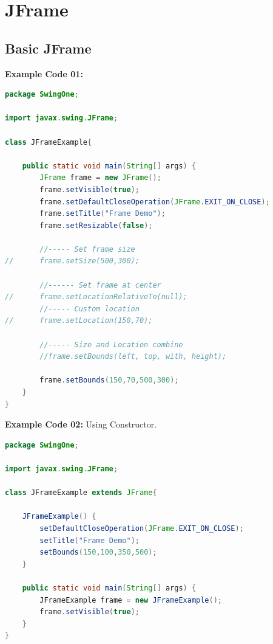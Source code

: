 \newpage
\section{JFrame}

\subsection{Basic JFrame}
\textbf{Example Code 01:}
\begin{lstlisting}[language=java]
package SwingOne;

import javax.swing.JFrame;

class JFrameExample{
	
	public static void main(String[] args) {
		JFrame frame = new JFrame();
		frame.setVisible(true);
		frame.setDefaultCloseOperation(JFrame.EXIT_ON_CLOSE);
		frame.setTitle("Frame Demo");
		frame.setResizable(false);
		
		//----- Set frame size
//		frame.setSize(500,300);
		
		//------ Set frame at center
//		frame.setLocationRelativeTo(null);
		//----- Custom location
//		frame.setLocation(150,70);
		
		//----- Size and Location combine
		//frame.setBounds(left, top, with, height);
		
		frame.setBounds(150,70,500,300);
	}
}
\end{lstlisting}

\textbf{Example Code 02:} Using Constructor.
\begin{lstlisting}[language=java]
package SwingOne;

import javax.swing.JFrame;

class JFrameExample extends JFrame{
	
	JFrameExample() {
		setDefaultCloseOperation(JFrame.EXIT_ON_CLOSE);
		setTitle("Frame Demo");
		setBounds(150,100,350,500);
	}
	
	public static void main(String[] args) {
		JFrameExample frame = new JFrameExample();
		frame.setVisible(true);
	}
}
\end{lstlisting}

\newpage
